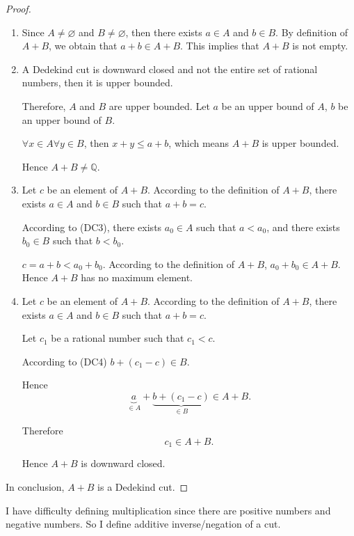 \begin{proof}
    \begin{enumerate}[label = (\roman*)]
        \item Since $A\ne\varnothing$ and $B\ne\varnothing$, then there exists $a\in A$ and $b\in B$. By definition of $A + B$, we obtain that $a + b \in A + B$. This implies that $A + B$ is not empty.
        \item A Dedekind cut is downward closed and not the entire set of rational numbers, then it is upper bounded.
              \par Therefore, $A$ and $B$ are upper bounded. Let $a$ be an upper bound of $A$, $b$ be an upper bound of $B$.
              \par $\forall x\in A\forall y\in B$, then $x + y \le a + b$, which means $A + B$ is upper bounded.
              \par Hence $A + B\ne\mathbb{Q}$.
        \item Let $c$ be an element of $A + B$. According to the definition of $A + B$, there exists $a\in A$ and $b\in B$ such that $a + b = c$.
              \par According to (DC3), there exists $a_{0}\in A$ such that $a < a_{0}$, and there exists $b_{0}\in B$ such that $b < b_{0}$.
              \par $c = a + b < a_{0} + b_{0}$. According to the definition of $A + B$, $a_{0} + b_{0} \in A + B$. Hence $A + B$ has no maximum element.
        \item Let $c$ be an element of $A + B$. According to the definition of $A + B$, there exists $a\in A$ and $b\in B$ such that $a + b = c$.
              \par Let $c_{1}$ be a rational number such that $c_{1} < c$.
              \par According to (DC4) $b + (c_{1} - c)\in B$.
              \par Hence
              \[
                  \underbrace{a}_{\in A} + \underbrace{b + (c_{1} - c)}_{\in B} \in A + B.
              \]
              \par Therefore
              \[
                  c_{1} \in A + B.
              \]
              \par Hence $A + B$ is downward closed.
    \end{enumerate}
    \par In conclusion, $A + B$ is a Dedekind cut.
\end{proof}

\par I have difficulty defining multiplication since there are positive numbers and negative numbers. So I define additive inverse/negation of a cut.

